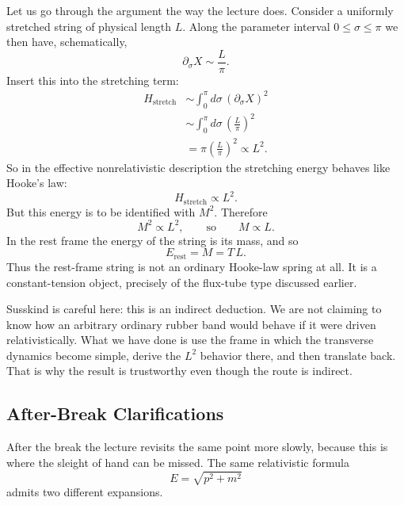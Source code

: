 Let us go through the argument the way the lecture does. Consider a uniformly stretched string of physical length \(L\). Along the parameter interval \(0\leq \sigma\leq \pi\) we then have, schematically,
\begin{equation}
\partial_\sigma X \sim \frac{L}{\pi}.
\end{equation}
Insert this into the stretching term:
\begin{align}
H_{\mathrm{stretch}}
&\sim
\int_0^\pi d\sigma\,\left(\partial_\sigma X\right)^2
\\
&\sim
\int_0^\pi d\sigma\,\left(\frac{L}{\pi}\right)^2
\\
&=
\pi\left(\frac{L}{\pi}\right)^2
\propto L^2.
\end{align}
So in the effective nonrelativistic description the stretching energy behaves like Hooke's law:
\begin{equation}
H_{\mathrm{stretch}} \propto L^2.
\end{equation}
But this energy is to be identified with \(M^2\). Therefore
\begin{equation}
M^2\propto L^2,
\qquad \text{so} \qquad
M\propto L.
\end{equation}
In the rest frame the energy of the string is its mass, and so
\begin{equation}
E_{\text{rest}}=M=T\,L.
\end{equation}
Thus the rest-frame string is not an ordinary Hooke-law spring at all. It is a constant-tension object, precisely of the flux-tube type discussed earlier.

Susskind is careful here: this is an indirect deduction. We are not claiming to know how an arbitrary ordinary rubber band would behave if it were driven relativistically. What we have done is use the frame in which the transverse dynamics become simple, derive the \(L^2\) behavior there, and then translate back. That is why the result is trustworthy even though the route is indirect.

\subsection{After-Break Clarifications}

After the break the lecture revisits the same point more slowly, because this is where the sleight of hand can be missed. The same relativistic formula
\begin{equation}
E=\sqrt{p^2+m^2}
\end{equation}
admits two different expansions.

